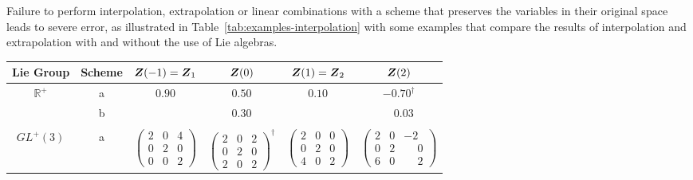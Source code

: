 \documentclass[12pt]{article}
\newcommand{\mbb}[1]{\mathbb{#1}}
\begin{document}
Failure to perform interpolation, extrapolation or linear combinations with a
scheme that preserves the variables in their original space leads to severe
error, as illustrated in Table~\ref{tab:examples-interpolation} with some
examples that compare the results of interpolation and extrapolation with and
without the use of Lie algebras.

\begin{table}[htbp]
  \begin{center}
    \begin{tabular}{ c c c c c c}
      \toprule
      Lie Group
      &
      Scheme
      &
      ${\boldsymbol{Z}}(-1) = {\boldsymbol{Z}}_1$
      &
      ${\boldsymbol{Z}}(0)$
      &
      ${\boldsymbol{Z}}(1) = {\boldsymbol{Z}}_2$
      &
      ${\boldsymbol{Z}}(2)$
      \\
      \hline
      \multirow{2}{*}{$\mbb{R}^+$}
      &
      a
      &
      \multirow{2}{*}{$0.90$}
      &
      $0.50$
      &
      \multirow{2}{*}{$0.10$}
      &
      ${-0.70}^\dagger$
      \\
      
      &
      b
      &
      
      &
      $0.30$
      &
      
      &
      $\phantom{-}0.03\phantom{^\dagger}$
      \\
      \\
      \multirow{4}{*}{$GL^+(3)$}
      &
      \multirow{2}{*}{a}
      &
      \multirow{4}{*}{
        $\left(
          \begin{smallmatrix}
            2 & 0 & 4\\
            0 & 2 & 0\\
            0 & 0 & 2
          \end{smallmatrix}
        \right)$}
      &
      \multirow{2}{*}{
        ${\left(
          \begin{smallmatrix}
            2 & 0 & 2\\
            0 & 2 & 0\\
            2 & 0 & 2
          \end{smallmatrix}
        \right)}^\dagger$}
      &
      \multirow{4}{*}{
        $\left(
          \begin{smallmatrix}
            2 & 0 & 0\\
            0 & 2 & 0\\
            4 & 0 & 2
          \end{smallmatrix}
        \right)$}
      &
      \multirow{2}{*}{
        $\left(
          \begin{smallmatrix}
            2 & 0 & -2\\
            0 & 2 & \phantom{-}0\\
            6 & 0 & \phantom{-}2
          \end{smallmatrix}
        \right)$}
      \\
      \\


\end{tabular}
\end{center}
\end{table}
\end{document}

